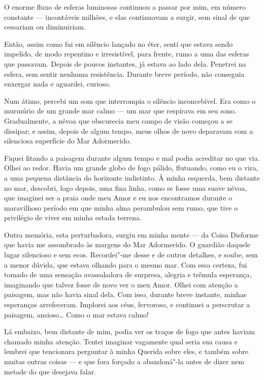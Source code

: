 O enorme fluxo de esferas luminosas continuou a passar por mim, em número constante --- incontáveis milhões, e elas
continuavam a surgir, sem sinal de que cessariam ou diminuiriam.

Então, assim como fui em silêncio lançado no éter, senti que estava sendo impelido, de modo repentino e
irresistível, para frente, rumo a uma das esferas que passavam. Depois de poucos instantes, já estava ao lado dela.
Penetrei na esfera, sem sentir nenhuma resistência. Durante breve período, não conseguia enxergar nada e
aguardei, curioso.

Num átimo, percebi um som que interrompia o silêncio inconcebível. Era como o murmúrio de um grande mar calmo --- um mar
que respirava em seu sono. Gradualmente, a névoa que obscurecia meu campo de visão começou a se dissipar; e assim,
depois de algum tempo, meus olhos de novo deparavam com a silenciosa superfície do Mar Adormecido.

Fiquei fitando a paisagem durante algum tempo e mal podia acreditar no que via. Olhei ao redor. Havia um grande globo
de fogo pálido, flutuando, como eu o vira, a uma pequena distância do horizonte indistinto. À minha esquerda, bem
distante no mar, descobri, logo depois, uma fina linha, como se fosse uma suave névoa, que imaginei ser a praia onde
meu Amor e eu nos encontramos durante o maravilhoso período em que minha alma perambulou sem rumo, que tive o
privilégio de viver em minha estada terrena.

Outra memória, esta perturbadora, surgiu em minha mente --- da Coisa Disforme que havia me assombrado às margens do Mar
Adormecido. O guardião daquele lugar silencioso e sem ecos. Recordei"-me desse e de outros detalhes, e soube, sem a
menor dúvida, que estava olhando para o mesmo mar. Com essa certeza, fui tomado de uma sensação avassaladora de
surpresa, alegria e trêmula esperança, imaginando que talvez fosse de novo ver o meu Amor. Olhei com atenção a
paisagem, mas não havia sinal dela. Com isso, durante breve instante, minhas esperanças arrefeceram. Implorei aos
céus, fervoroso, e continuei a perscrutar a paisagem, ansioso\ldots{} Como o mar estava calmo!

Lá embaixo, bem distante de mim, podia ver os traços de fogo que antes haviam chamado minha atenção. Tentei imaginar
vagamente qual seria sua causa e lembrei que tencionara perguntar à minha Querida sobre eles, e também sobre muitas
outras coisas --- e que fora forçado a abandoná"-la antes de dizer nem metade do que desejava falar.


